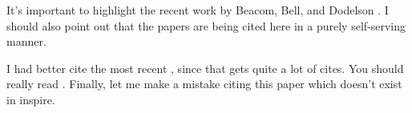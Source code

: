 It's important to highlight the recent
work by Beacom, Bell, and Dodelson \cite{Beacom:2004yd}. I should also point out that
the papers \cite{hep-th/0501240,1979PhLB...80..360E} are being cited here in a
purely self-serving manner.

I had better cite the most recent \cite{CERN-W5013}, since that
gets quite a lot of cites. You should really read \cite{CERN-W5013}.
Finally, let me make a mistake citing this paper \cite{Garcia:2020ay} which
doesn't exist in inspire.

\begin{thebibliography}{99}


\end{thebibliography}



